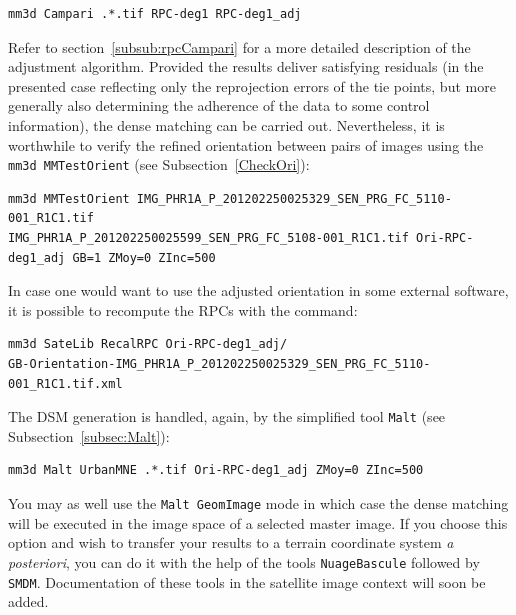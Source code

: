 \begin{verbatim}
mm3d Campari .*.tif RPC-deg1 RPC-deg1_adj
\end{verbatim}
%   
Refer to section~\ref{subsub:rpcCampari} for a more detailed description of the adjustment algorithm. Provided the results deliver satisfying residuals (in the presented case reflecting only the reprojection errors of the tie points, but more generally also determining the adherence of the data to some control information), the dense matching can be carried out. Nevertheless, it is worthwhile to verify the refined orientation between pairs of images using the {\tt mm3d MMTestOrient} (see Subsection~\ref{CheckOri}):
\begin{verbatim}
mm3d MMTestOrient IMG_PHR1A_P_201202250025329_SEN_PRG_FC_5110-001_R1C1.tif 
IMG_PHR1A_P_201202250025599_SEN_PRG_FC_5108-001_R1C1.tif Ori-RPC-deg1_adj GB=1 ZMoy=0 ZInc=500
\end{verbatim}
%
In case one would want to use the adjusted orientation in some external software, it is possible to recompute the RPCs with the command:
\begin{verbatim}
mm3d SateLib RecalRPC Ori-RPC-deg1_adj/
GB-Orientation-IMG_PHR1A_P_201202250025329_SEN_PRG_FC_5110-001_R1C1.tif.xml
\end{verbatim}
The DSM generation is handled, again, by the simplified tool {\tt Malt} (see Subsection~\ref{subsec:Malt}): 
\begin{verbatim}
mm3d Malt UrbanMNE .*.tif Ori-RPC-deg1_adj ZMoy=0 ZInc=500
\end{verbatim}
%
You may as well use the {\tt Malt GeomImage} mode in which case the dense matching will be executed in the image space of a selected master image. If you choose this option and wish to transfer your results to a terrain coordinate system \textit{a posteriori}, you can do it with the help of the tools {\tt NuageBascule} followed by {\tt SMDM}. Documentation of these tools in the satellite image context will soon be added.


